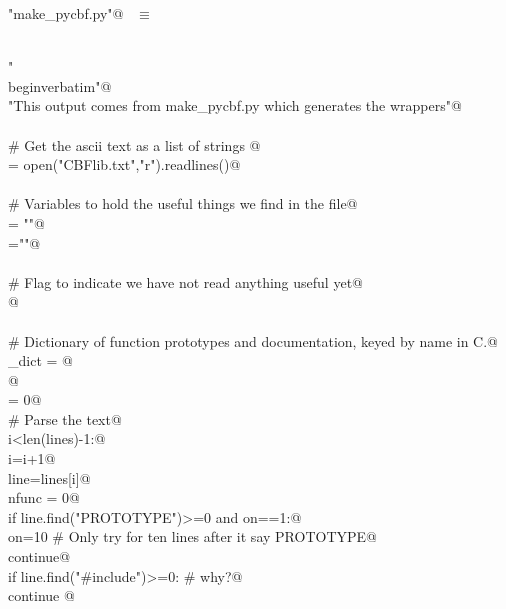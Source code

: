 \documentclass[10pt,a4paper,twoside,notitlepage]{article}
\begin{document}
\begin{flushleft} \small \label{scrap5}
\verb@"make_pycbf.py"@\nobreak\ {\footnotesize {} }$\equiv$
\vspace{-1ex}
\begin{list}{}{} \item
\mbox{}\verb@@\\
\mbox{}\verb@print "\\begin{verbatim}"@\\
\mbox{}\verb@print "This output comes from make_pycbf.py which generates the wrappers"@\\
\mbox{}\verb@@\\
\mbox{}\verb@# Get the ascii text as a list of strings @\\
\mbox{}\verb@lines = open("CBFlib.txt","r").readlines()@\\
\mbox{}\verb@@\\
\mbox{}\verb@# Variables to hold the useful things we find in the file@\\
\mbox{}\verb@docstring = "\n"@\\
\mbox{}\verb@name=""@\\
\mbox{}\verb@@\\
\mbox{}\verb@# Flag to indicate we have not read anything useful yet@\\
\mbox{}@\\
\mbox{}\verb@@\\
\mbox{}\verb@# Dictionary of function prototypes and documentation, keyed by name in C.@\\
\mbox{}\verb@name_dict = {}@\\
\mbox{}@\\
\mbox{}\verb@debug = 0@\\
\mbox{}\verb@# Parse the text@\\
\mbox{}\verb@while i<len(lines)-1:@\\
\mbox{}\verb@   i=i+1@\\
\mbox{}\verb@   line=lines[i]@\\
\mbox{}\verb@   nfunc = 0@\\
\mbox{}\verb@   if line.find("PROTOTYPE")>=0 and on==1:@\\
\mbox{}\verb@      on=10 # Only try for ten lines after it say PROTOTYPE@\\
\mbox{}\verb@      continue@\\
\mbox{}\verb@   if line.find("#include")>=0: # why?@\\
\mbox{}\verb@      continue @\\

\end{list}
\end{flushleft}
\end{document}
